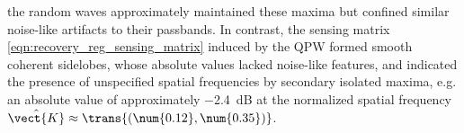 the random waves approximately maintained these
maxima but confined
similar noise-like artifacts to
their passbands.
In contrast,
the sensing matrix
\eqref{eqn:recovery_reg_sensing_matrix} induced by
the \ac{QPW} formed
smooth coherent sidelobes, whose
absolute values lacked
noise-like features, and indicated
the presence of
unspecified spatial frequencies by
secondary isolated maxima, e.g.
an absolute value of
approximately \SI{-2.4}{\deci\bel} at
the normalized spatial frequency
$\hat{\vect{K}} \approx \trans{ ( \num{0.12}, \num{0.35} ) }$.


